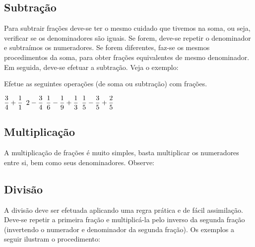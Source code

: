 	\subsection{Subtração}
	Para subtrair frações deve-se ter o mesmo cuidado que tivemos na soma, ou seja, verificar se os denominadores são iguais. Se forem, deve-se repetir o denominador e subtraímos os numeradores. Se forem diferentes, faz-se os mesmos procedimentos da soma, para obter frações equivalentes de mesmo denominador. Em seguida, deve-se  efetuar a subtração. Veja o exemplo:

        \begin{texample}
        \centering
        \end{texample}
	
	Efetue as seguintes operações (de soma ou subtração) com frações.
	
	\begin{tasks}
		\task $\displaystyle\frac{3}{4} + \displaystyle\frac{1}{1} $
		\task $ 2 - \displaystyle\frac{3}{4} $
		\task $\displaystyle\frac{1}{6} - \displaystyle\frac{1}{9} + \displaystyle\frac{1}{3} $
		\task $\displaystyle\frac{1}{5} - \displaystyle\frac{3}{5} + \displaystyle\frac{2}{5} $
	\end{tasks}
	
	\subsection{Multiplicação}
	
	A multiplicação de frações é muito simples, basta multiplicar os numeradores entre si, bem como seus denominadores. Observe:

        \begin{texample}
        \centering
        \end{texample}
	
	\subsection{Divisão}
 
    A divisão deve ser efetuada aplicando uma regra prática e de fácil assimilação. Deve-se repetir a primeira fração e multiplicá-la pelo inverso da segunda fração (invertendo o numerador e denominador da segunda fração). Os exemplos a seguir ilustram o procedimento:

